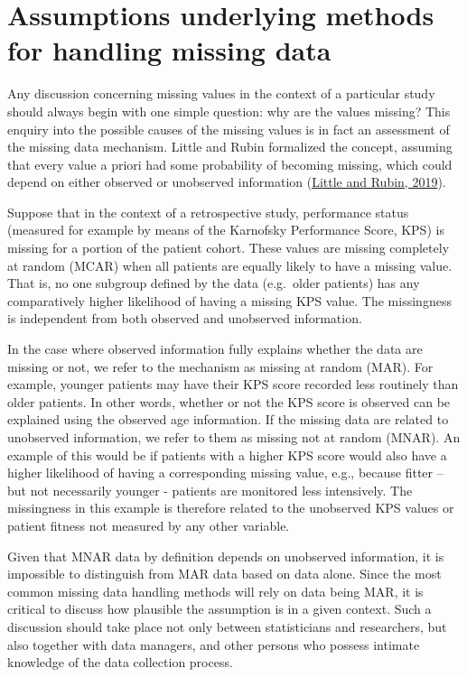 \documentclass[
  letterpaper,
  DIV=11,
  numbers=noendperiod]{scrreprt}
\begin{document}
\hypertarget{assumptions-underlying-methods-for-handling-missing-data}{%
\section{Assumptions underlying methods for handling missing
data}\label{assumptions-underlying-methods-for-handling-missing-data}}

Any discussion concerning missing values in the context of a particular
study should always begin with one simple question: why are the values
missing? This enquiry into the possible causes of the missing values is
in fact an assessment of the missing data mechanism. Little and Rubin
formalized the concept, assuming that every value a priori had some
probability of becoming missing, which could depend on either observed
or unobserved information
(\protect\hyperlink{ref-littleStatisticalAnalysisMissing2019}{Little and
Rubin, 2019}).

Suppose that in the context of a retrospective study, performance status
(measured for example by means of the Karnofsky Performance Score, KPS)
is missing for a portion of the patient cohort. These values are missing
completely at random (MCAR) when all patients are equally likely to have
a missing value. That is, no one subgroup defined by the data
(e.g.~older patients) has any comparatively higher likelihood of having
a missing KPS value. The missingness is independent from both observed
and unobserved information.

In the case where observed information fully explains whether the data
are missing or not, we refer to the mechanism as missing at random
(MAR). For example, younger patients may have their KPS score recorded
less routinely than older patients. In other words, whether or not the
KPS score is observed can be explained using the observed age
information. If the missing data are related to unobserved information,
we refer to them as missing not at random (MNAR). An example of this
would be if patients with a higher KPS score would also have a higher
likelihood of having a corresponding missing value, e.g., because fitter
-- but not necessarily younger - patients are monitored less
intensively. The missingness in this example is therefore related to the
unobserved KPS values or patient fitness not measured by any other
variable.

Given that MNAR data by definition depends on unobserved information, it
is impossible to distinguish from MAR data based on data alone. Since
the most common missing data handling methods will rely on data being
MAR, it is critical to discuss how plausible the assumption is in a
given context. Such a discussion should take place not only between
statisticians and researchers, but also together with data managers, and
other persons who possess intimate knowledge of the data collection
process.
\end{document}
